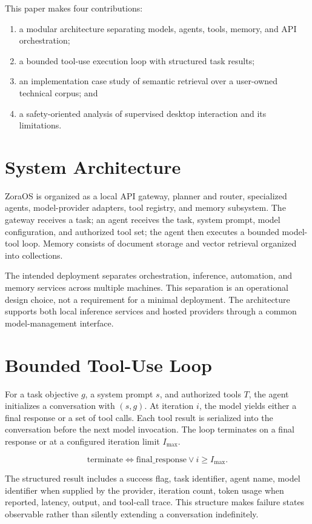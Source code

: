 \documentclass[11pt]{article}
\begin{document}
This paper makes four contributions:
\begin{enumerate}[leftmargin=*]
  \item a modular architecture separating models, agents, tools, memory, and API orchestration;
  \item a bounded tool-use execution loop with structured task results;
  \item an implementation case study of semantic retrieval over a user-owned technical corpus; and
  \item a safety-oriented analysis of supervised desktop interaction and its limitations.
\end{enumerate}

\section{System Architecture}
ZoraOS is organized as a local API gateway, planner and router, specialized agents, model-provider adapters, tool registry, and memory subsystem. The gateway receives a task; an agent receives the task, system prompt, model configuration, and authorized tool set; the agent then executes a bounded model-tool loop. Memory consists of document storage and vector retrieval organized into collections.

The intended deployment separates orchestration, inference, automation, and memory services across multiple machines. This separation is an operational design choice, not a requirement for a minimal deployment. The architecture supports both local inference services and hosted providers through a common model-management interface.

\section{Bounded Tool-Use Loop}
For a task objective $g$, a system prompt $s$, and authorized tools $T$, the agent initializes a conversation with $(s,g)$. At iteration $i$, the model yields either a final response or a set of tool calls. Each tool result is serialized into the conversation before the next model invocation. The loop terminates on a final response or at a configured iteration limit $I_{\max}$.

\begin{equation}
  \mathrm{terminate} \iff \mathrm{final\_response} \lor i \geq I_{\max}.
\end{equation}

The structured result includes a success flag, task identifier, agent name, model identifier when supplied by the provider, iteration count, token usage when reported, latency, output, and tool-call trace. This structure makes failure states observable rather than silently extending a conversation indefinitely.
\end{document}
